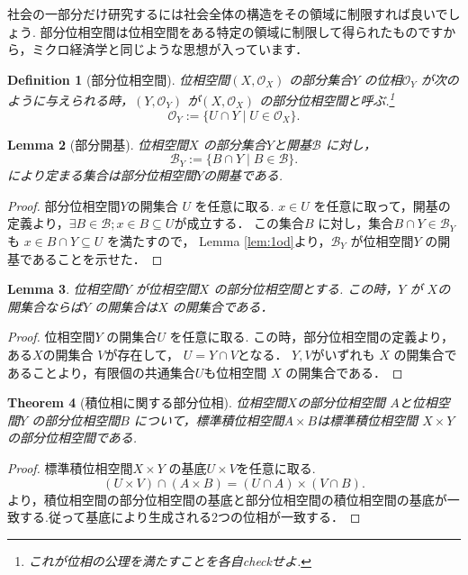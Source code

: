 \documentclass[lualatex]{ltjsbook}
\newtheorem{theorem}{Theorem}[section]
\newtheorem{lemma}[theorem]{Lemma}
\newtheorem{definition}[theorem]{Definition}
\theoremstyle{remark}
\theoremstyle{plain}
\begin{document}
社会の一部分だけ研究するには社会全体の構造をその領域に制限すれば良いでしょう. 部分位相空間は位相空間をある特定の領域に制限して得られたものですから，ミクロ経済学と同じような思想が入っています．

\begin{definition}[部分位相空間]
	位相空間$\left( X,\mathcal{O}_X \right) $ の部分集合$Y$ の位相$\mathcal{O}_Y$ が次のように与えられる時，$(Y,\mathcal{O}_Y)$ が$\left( X, \mathcal{O}_X \right) $ の部分位相空間と呼ぶ.\footnote{これが位相の公理を満たすことを各自checkせよ.}
	\[
	\mathcal{O}_Y := \{U \cap Y  \mid U \in \mathcal{O}_X\}
	.\] 

\end{definition}

\begin{lemma}[部分開基]
	位相空間$X$ の部分集合$Y$と開基$\mathcal{B}$ に対し，
	\[
	\mathcal{B}_Y := \{B\cap Y \mid B \in \mathcal{B}\} 
	.\]
	により定まる集合は部分位相空間$Y$の開基である.
\end{lemma}

\begin{proof}
	部分位相空間$Y$の開集合 $U$ を任意に取る.
	$x \in U$ を任意に取って，開基の定義より，$\exists B \in \mathcal{B}; x \in B \subseteq U$が成立する．
	この集合$B$ に対し，集合$B \cap Y \in \mathcal{B}_Y$も $x \in B \cap Y  \subseteq U$ を満たすので， Lemma \ref{lem:1od}より，$\mathcal{B}_Y$ が位相空間$Y$ の開基であることを示せた．
\end{proof}

\begin{lemma}
\label{lem:openset}
	位相空間$Y$ が位相空間$X$ の部分位相空間とする.
	この時，$Y$ が $X$の開集合ならば$Y$ の開集合は$X$ の開集合である．
\end{lemma}

\begin{proof}
	位相空間$Y$ の開集合$U$ を任意に取る.
	この時，部分位相空間の定義より，ある$X$の開集合 $V$が存在して， $U=Y\cap V$となる．
	$Y,V$がいずれも $X$ の開集合であることより，有限個の共通集合$U$も位相空間 $X$ の開集合である．
\end{proof}

\begin{theorem}[積位相に関する部分位相]
	位相空間$X$の部分位相空間 $A$と位相空間$Y$ の部分位相空間$B$ について，標準積位相空間$A\times B$は標準積位相空間 $X \times Y$の部分位相空間である.
\end{theorem}

\begin{proof}
	標準積位相空間$X \times Y$ の基底$U\times V$を任意に取る.
	 \[
		 \left(U \times V\right) \cap \left( A \times B \right) = \left( U \cap A  \right) \times \left( V \cap B \right) 
	.\]
	より，積位相空間の部分位相空間の基底と部分位相空間の積位相空間の基底が一致する.従って基底により生成される2つの位相が一致する．
\end{proof}
\end{document}
